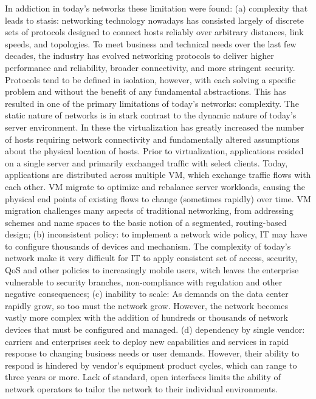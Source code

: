 In addiction in today's networks these limitation were found: (a) complexity that leads to stasis: networking technology nowadays has consisted largely of discrete sets of protocols designed to connect hosts reliably over arbitrary distances, link speeds, and topologies. To meet business and technical needs over the last few decades, the industry has evolved networking protocols to deliver higher performance and reliability, broader connectivity, and more stringent security. Protocols tend to be defined in isolation, however, with each solving a specific problem and without the benefit of any fundamental abstractions. This has resulted in one of the primary limitations of today's networks: complexity. The static nature of networks is in stark contrast to the dynamic nature of today's server environment. In these the virtualization has greatly increased the number of hosts requiring network connectivity and fundamentally altered assumptions about the physical location of hosts. Prior to virtualization, applications resided on a single server and primarily exchanged traffic with select clients. Today, applications are distributed across multiple \ac{VM}, which exchange traffic flows with each other. \ac{VM} migrate to optimize and rebalance server workloads, causing the physical end points of existing flows to change (sometimes rapidly) over time. \ac{VM} migration challenges many aspects of traditional networking, from addressing schemes and name spaces to the basic notion of a segmented, routing-based design; (b) inconsistent policy: to implement a network wide policy, \ac{IT} may have to configure thousands of devices and mechanism. The complexity of today's network make it very difficult for \ac{IT} to apply consistent set of access, security, \ac{QoS} and other policies to increasingly mobile users, witch leaves the enterprise vulnerable to security branches, non-compliance with regulation and other negative consequences; (c) inability to scale: As demands on the data center rapidly grow, so too must the network grow. However, the network becomes vastly more complex with the addition of hundreds or thousands of network devices that must be configured and managed. (d) dependency by single vendor: carriers and enterprises seek to deploy new capabilities and services in rapid response to changing business needs or user demands. However, their ability to respond is hindered by vendor's equipment product cycles, which can range to three years or more. Lack of standard, open interfaces limits the ability of network operators to tailor the network to their individual environments.

